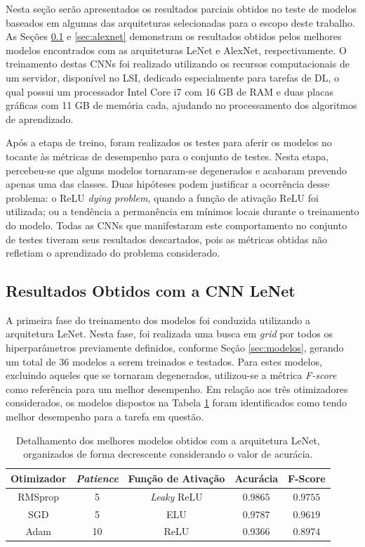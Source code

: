 
Nesta seção serão apresentados os resultados parciais obtidos no teste de modelos baseados em algumas das arquiteturas selecionadas para o escopo deste trabalho. As Seções \ref{sec:lenet} e \ref{sec:alexnet} demonstram os resultados obtidos pelos melhores modelos encontrados com as arquiteturas LeNet e AlexNet, respectivamente. O treinamento destas CNNs foi realizado utilizando os recursos computacionais de um servidor, disponível no LSI, dedicado especialmente para tarefas de DL, o qual possui um processador Intel Core i7 com 16 GB de RAM e duas placas gráficas com 11 GB de memória cada, ajudando no processamento dos algoritmos de aprendizado.

Após a etapa de treino, foram realizados os testes para aferir os modelos no tocante às métricas de desempenho para o conjunto de testes. Nesta etapa, percebeu-se que alguns modelos tornaram-se degenerados e acabaram prevendo apenas uma das classes. Duas hipóteses podem justificar a ocorrência desse problema: o ReLU \emph{dying problem}, quando a função de ativação ReLU foi utilizada; ou a tendência a permanência em mínimos locais durante o treinamento do modelo. Todas as CNNs que manifestaram este comportamento no conjunto de testes tiveram seus resultados descartados, pois as métricas obtidas não refletiam o aprendizado do problema considerado.


\subsection{Resultados Obtidos com a CNN LeNet}
\label{sec:lenet}

A primeira fase do treinamento dos modelos foi conduzida utilizando a arquitetura LeNet. Nesta fase, foi realizada uma busca em \emph{grid} por todos os hiperparâmetros previamente definidos, conforme Seção \ref{sec:modelos}, gerando um total de $36$ modelos a serem treinados e testados. Para estes modelos, excluindo aqueles que se tornaram degenerados, utilizou-se a métrica \emph{F-score} como referência para um melhor desempenho. Em relação aos três otimizadores considerados, os modelos dispostos na Tabela \ref{tab:lenet} foram identificados como tendo melhor desempenho para a tarefa em questão.

\begin{table}[h!]
\centering
\caption{Detalhamento dos melhores modelos obtidos com a arquitetura LeNet, organizados de forma decrescente considerando o valor de acurácia.}
\label{tab:lenet}
\begin{tabular}{ccccc}
\toprule
\textbf{Otimizador} & \textbf{\emph{Patience}}  & \textbf{Função de Ativação} & \textbf{Acurácia} & \textbf{F-Score} \\
\midrule
RMSprop & 5 & \emph{Leaky} ReLU & $0.9865$ & $0.9755$ \\
SGD & 5 & ELU & $0.9787$ & $0.9619$ \\
Adam & 10 & ReLU & $0.9366$ & $0.8974$ \\
\bottomrule
\end{tabular}
\end{table}


